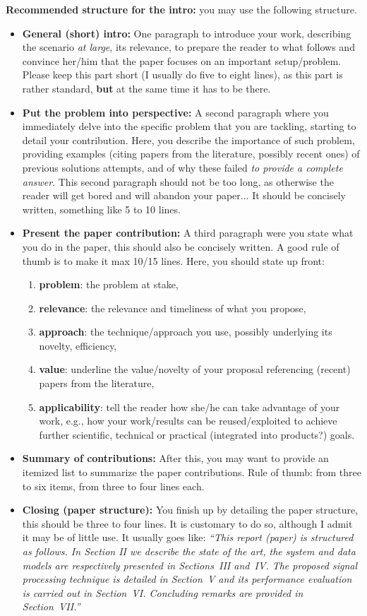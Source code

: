 \noindent \textbf{Recommended structure for the intro:} you may use the following structure. 
\begin{itemize}
\item \textbf{General (short) intro:} One paragraph to introduce your work, describing the scenario {\it at large}, its relevance, to prepare the reader to what follows and convince her/him that the paper focuses on an important setup/problem. Please keep this part short (I usually do five to eight lines), as this part is rather standard, \textbf{but} at the same time it has to be there. 
\item \textbf{Put the problem into perspective:} A second paragraph where you immediately delve into the specific problem that you are tackling, starting to detail your contribution. Here, you describe the importance of such problem, providing examples (citing papers from the literature, possibly recent ones) of previous solutions attempts, and of why these failed {\it to provide a complete answer}. This second paragraph should not be too long, as otherwise the reader will get bored and will abandon your paper... It should be concisely written, something like 5 to 10 lines.
\item \textbf{Present the paper contribution:} A third paragraph were you state what you do in the paper, this should also be concisely written. A good rule of thumb is to make it max 10/15 lines. Here, you should state up front:
\begin{enumerate}
\item \textbf{problem}: the problem at stake, 
\item \textbf{relevance}: the relevance and timeliness of what you propose, 
\item \textbf{approach}: the technique/approach you use, possibly underlying its novelty, efficiency, 
\item \textbf{value}: underline the value/novelty of your proposal referencing (recent) papers from the literature,
\item \textbf{applicability}: tell the reader how she/he can take advantage of your work, e.g., how your work/results can be reused/exploited to achieve further scientific, technical or practical (integrated into products?) goals.
\end{enumerate}
\item \textbf{Summary of contributions:} After this, you may want to provide an itemized list to summarize the paper contributions. Rule of thumb: from three to six items, from three to four lines each.
\item \textbf{Closing (paper structure):} You finish up by detailing the paper structure, this should be three to four lines. It is customary to do so, although I admit it may be of little use. It usually goes like: {\it ``This report (paper) is structured as follows. In Section II we describe the state of the art, the system and data models are respectively presented in Sections~III and~IV. The proposed signal processing technique is detailed in Section~V and its performance evaluation is carried out in Section~VI. Concluding remarks are provided in Section~VII.''}
\end{itemize}


